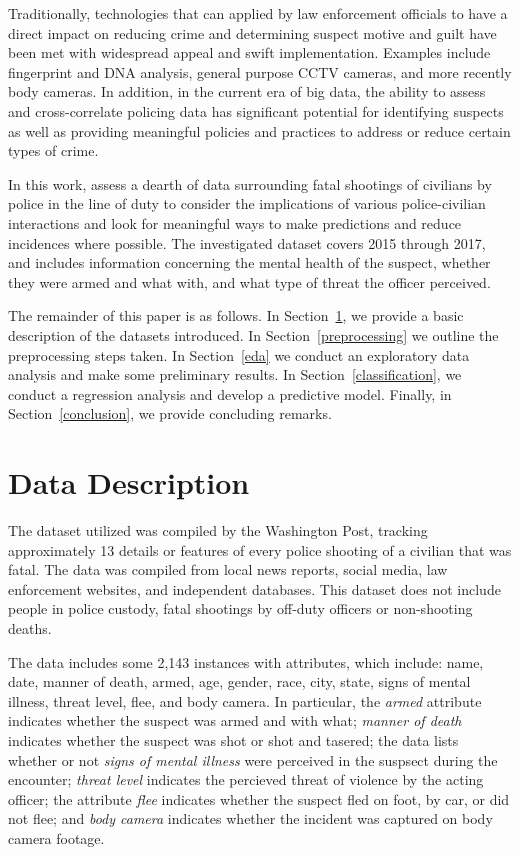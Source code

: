\documentclass[10pt, conference, compsocconf]{IEEEtran}
\begin{document}
Traditionally, technologies that can applied by law enforcement officials to have a direct impact on reducing crime and determining suspect motive and guilt have been met with widespread appeal and swift implementation. Examples include fingerprint and DNA analysis, general purpose CCTV cameras, and more recently body cameras. In addition, in the current era of big data, the ability to assess and cross-correlate policing data has significant potential for identifying suspects as well as providing meaningful policies and practices to address or reduce certain types of crime.

In this work, assess a dearth of data surrounding fatal shootings of civilians by police in the line of duty to consider the implications of various police-civilian interactions and look for meaningful ways to make predictions and reduce incidences where possible. The investigated dataset covers 2015 through 2017, and includes information concerning the mental health of the suspect, whether they were armed and what with, and what type of threat the officer perceived.

The remainder of this paper is as follows. In Section~\ref{description}, we provide a basic description of the datasets introduced. In Section~\ref{preprocessing} we outline the preprocessing steps taken. In Section~\ref{eda} we conduct an exploratory data analysis and make some preliminary results. In Section~\ref{classification}, we conduct a regression analysis and develop a predictive model. Finally, in Section~\ref{conclusion}, we provide concluding remarks.

\section{Data Description}\label{description}

The dataset utilized was compiled by the Washington Post, tracking approximately 13 details or features of every police shooting of a civilian that was fatal. The data was compiled from local news reports, social media, law enforcement websites, and independent databases. This dataset does not include people in police custody, fatal shootings by off-duty officers or non-shooting deaths. 

The data includes some 2,143 instances with attributes, which include: name, date, manner of death, armed, age, gender, race, city, state, signs of mental illness, threat level, flee, and body camera. In particular, the \textit{armed} attribute indicates whether the suspect was armed and with what; \textit{manner of death} indicates whether the suspect was shot or shot and tasered; the data lists whether or not \textit{signs of mental illness} were perceived in the suspsect during the encounter; \textit{threat level} indicates the percieved threat of violence by the acting officer; the attribute \textit{flee} indicates whether the suspect fled on foot, by car, or did not flee; and \textit{body camera} indicates whether the incident was captured on body camera footage.
\end{document}
